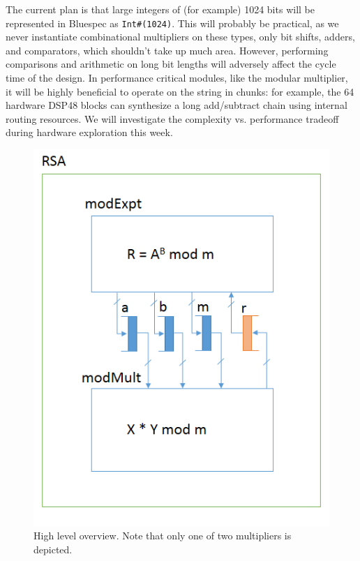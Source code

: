 \documentclass[12pt]{article}
\begin{document}
The current plan is that large integers of (for example) 1024 bits
will be represented in Bluespec as {\tt Int\#(1024)}.
This will probably be practical, as we never instantiate combinational multipliers on these types,
only bit shifts, adders, and comparators, which shouldn't take up much area. However, performing
comparisons and arithmetic on long bit lengths will adversely affect the cycle time of the design.
In performance critical modules, like the modular multiplier, it will be highly beneficial
to operate on the string in chunks: for example, the 64 hardware DSP48 blocks can synthesize
a long add/subtract chain using internal routing resources. We will investigate the complexity vs. performance
tradeoff during hardware exploration this week.

\begin{figure}
  \begin{centering}
    \includegraphics[scale=1]{top_level.png}
    \caption{High level overview. Note that only one of two multipliers is depicted.}
    \label{fig-top}
  \end{centering}
\end{figure}
\end{document}
